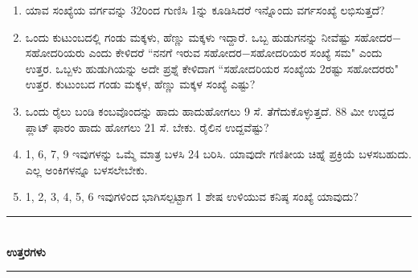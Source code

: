 \begin{enumerate}
\item ಯಾವ ಸಂಖ್ಯೆಯ ವರ್ಗವನ್ನು 32ರಿಂದ ಗುಣಿಸಿ 1ನ್ನು ಕೂಡಿಸಿದರೆ ಇನ್ನೊಂದು ವರ್ಗಸಂಖ್ಯೆ ಲಭಿಸುತ್ತದೆ? 

\item ಒಂದು ಕುಟುಂಬದಲ್ಲಿ ಗಂಡು ಮಕ್ಕಳು, ಹೆಣ್ಣು ಮಕ್ಕಳು ಇದ್ದಾರೆ. ಒಬ್ಬ ಹುಡುಗನನ್ನು ನೀವೆಷ್ಟು ಸಹೋದರ$-$ಸಹೋದರಿಯರು ಎಂದು ಕೇಳಿದರೆ ``ನನಗೆ ಇರುವ ಸಹೋದರ$-$ಸಹೋದರಿಯರ ಸಂಖ್ಯೆ ಸಮ" ಎಂದು ಉತ್ತರ. ಒಬ್ಬಳು ಹುಡುಗಿಯನ್ನು ಅದೇ ಪ್ರಶ್ನೆ ಕೇಳಿದಾಗ ``ಸಹೋದರಿಯರ ಸಂಖ್ಯೆಯ 2ರಷ್ಟು ಸಹೋದರರು" ಉತ್ತರ. ಕುಟುಂಬದ ಗಂಡು ಮಕ್ಕಳ, ಹೆಣ್ಣು ಮಕ್ಕಳ ಸಂಖ್ಯೆ ಎಷ್ಟು? 

\item ಒಂದು ರೈಲು ಬಂಡಿ ಕಂಬವೊಂದನ್ನು ಹಾದು ಹಾದುಹೋಗಲು 9 ಸೆ. ತೆಗೆದುಕೊಳ್ಳುತ್ತದೆ. 88 ಮೀ ಉದ್ದದ ಪ್ಲಾಟ್ ಫಾರಂ ಹಾದು ಹೋಗಲು 21 ಸೆ. ಬೇಕು. ರೈಲಿನ ಉದ್ದವೆಷ್ಟು? 

\item 1, 6, 7, 9 ಇವುಗಳನ್ನು ಒಮ್ಮೆ ಮಾತ್ರ ಬಳಸಿ 24 ಬರಿಸಿ. ಯಾವುದೇ ಗಣಿತೀಯ ಚಿಹ್ನೆ ಪ್ರಕ್ರಿಯೆ ಬಳಸಬಹುದು. ಎಲ್ಲ ಅಂಕಿಗಳನ್ನೂ ಬಳಸಲೇಬೇಕು. 

\item 1, 2, 3, 4, 5, 6 ಇವುಗಳಿಂದ ಭಾಗಿಸಲ್ಪಟ್ಟಾಗ 1 ಶೇಷ ಉಳಿಯುವ ಕನಿಷ್ಠ ಸಂಖ್ಯೆ ಯಾವುದು? 
\end{enumerate}

\smallskip

\begin{center}
\rule{5cm}{1pt}\\[3pt]
{\Large\bfseries ಉತ್ತರಗಳು}\\[-0.1cm]
\rule{5cm}{1pt}
\end{center}

